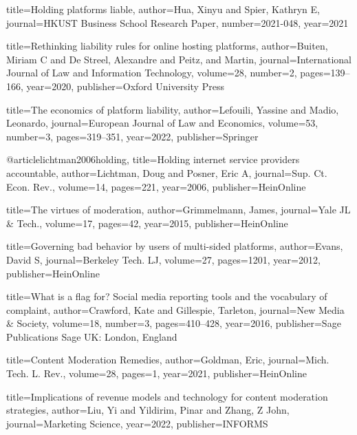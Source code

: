 {
  title={Holding platforms liable},
  author={Hua, Xinyu and Spier, Kathryn E},
  journal={HKUST Business School Research Paper},
  number={2021-048},
  year={2021}
}

{
  title={Rethinking liability rules for online hosting platforms},
  author={Buiten, Miriam C and De Streel, Alexandre and Peitz, and Martin},
  journal={International Journal of Law and Information Technology},
  volume={28},
  number={2},
  pages={139--166},
  year={2020},
  publisher={Oxford University Press}
}

{
  title={The economics of platform liability},
  author={Lefouili, Yassine and Madio, Leonardo},
  journal={European Journal of Law and Economics},
  volume={53},
  number={3},
  pages={319--351},
  year={2022},
  publisher={Springer}
}

@article{lichtman2006holding,
  title={Holding internet service providers accountable},
  author={Lichtman, Doug and Posner, Eric A},
  journal={Sup. Ct. Econ. Rev.},
  volume={14},
  pages={221},
  year={2006},
  publisher={HeinOnline}
}



{
  title={The virtues of moderation},
  author={Grimmelmann, James},
  journal={Yale JL \& Tech.},
  volume={17},
  pages={42},
  year={2015},
  publisher={HeinOnline}
}


{
  title={Governing bad behavior by users of multi-sided platforms},
  author={Evans, David S},
  journal={Berkeley Tech. LJ},
  volume={27},
  pages={1201},
  year={2012},
  publisher={HeinOnline}
}

{
  title={What is a flag for? Social media reporting tools and the vocabulary of complaint},
  author={Crawford, Kate and Gillespie, Tarleton},
  journal={New Media \& Society},
  volume={18},
  number={3},
  pages={410--428},
  year={2016},
  publisher={Sage Publications Sage UK: London, England}
}

{
  title={Content Moderation Remedies},
  author={Goldman, Eric},
  journal={Mich. Tech. L. Rev.},
  volume={28},
  pages={1},
  year={2021},
  publisher={HeinOnline}
}


{
  title={Implications of revenue models and technology for content moderation strategies},
  author={Liu, Yi and Yildirim, Pinar and Zhang, Z John},
  journal={Marketing Science},
  year={2022},
  publisher={INFORMS}
}


